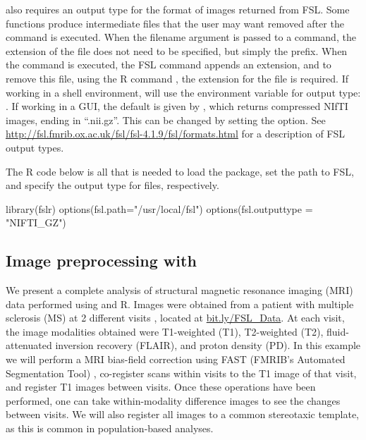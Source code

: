  also requires an output type for the format of images returned from FSL.  Some  functions produce intermediate files that the user may want removed after the command is executed.  When the filename argument is passed to a  command, the extension of the file does not need to be specified, but simply the prefix.  When the command is executed, the FSL command appends an extension, and to remove this file, using the R command , the extension for the file is required.  If working in a shell environment,  will use the environment variable for output type: .  If working in a GUI, the default is given by , which returns compressed NIfTI images, ending in ``.nii.gz''.  This can be changed by setting the  option.  See \url{http://fsl.fmrib.ox.ac.uk/fsl/fsl-4.1.9/fsl/formats.html} for a description of FSL output types.

The R code below is all that is needed to load the  package, set the path to FSL, and specify the output type for files, respectively.
\begin{Schunk}
\begin{Sinput}
library(fslr)
options(fsl.path="/usr/local/fsl")
options(fsl.outputtype = "NIFTI_GZ")
\end{Sinput}
\end{Schunk}

\subsection{Image preprocessing with }

We present a complete analysis of structural magnetic resonance imaging (MRI) data performed using  and R.  Images were obtained from a patient with multiple sclerosis (MS) at 2 different visits \citep{sweeney_automatic_2013}, located at \url{bit.ly/FSL_Data}.  At each visit, the image modalities obtained were T1-weighted (T1), T2-weighted (T2), fluid-attenuated inversion recovery (FLAIR), and proton density (PD). In this example we will perform a MRI bias-field correction using FAST (FMRIB's Automated Segmentation Tool) \citep{zhang_segmentation_2001}, co-register scans within visits to the T1 image of that visit, and register T1 images between visits.  Once these operations have been performed, one can take within-modality difference images to see the changes between visits.  We will also register all images to a common stereotaxic template, as this is common in population-based analyses.



